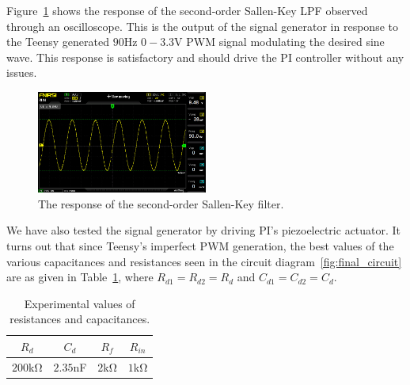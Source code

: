 
Figure~\ref{fig:sallenkey_osc} shows the response of the second-order Sallen-Key
LPF observed through an oscilloscope. This is the output of the signal generator
in response to the Teensy generated $90$\unit{\hertz} $0-3.3$\unit{\volt} PWM
signal modulating the desired sine wave. This response is satisfactory and
should drive the PI controller without any issues.

\begin{figure}[bh]
    \includegraphics[width=0.5\textwidth]{./figures/output_osc.jpg}
    \caption{The response of the second-order Sallen-Key filter.}
    \label{fig:sallenkey_osc}
\end{figure}

We have also tested the signal generator by driving PI's piezoelectric actuator.
It turns out that since Teensy's imperfect PWM generation, the best values of
the various capacitances and resistances seen in the circuit
diagram~\ref{fig:final_circuit} are as given in Table~\ref{tab:values}, where
$R_{d1} = R_{d2} = R_d$ and $C_{d1} = C_{d2} = C_d$.

{\renewcommand{\arraystretch}{1.5}
\begin{table}
    \centering
    \caption{Experimental values of resistances and capacitances.}
    \begin{tabular}{*4c}
        \toprule
        $R_d$ & $C_d$ & $R_f$ & $R_{in}$ \\    
        \hline
        \midrule
        $200$\unit{\kilo\ohm} & $2.35$\unit{\nano\farad} & $2$\unit{\kilo\ohm} &
        $1$\unit{\kilo\ohm} \\
        \bottomrule
    \end{tabular}
    \label{tab:values}
    \vspace{-1em}
\end{table}
}

